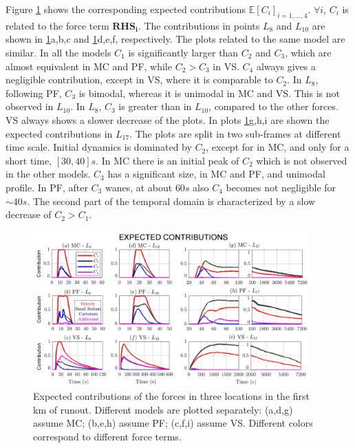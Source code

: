 \documentclass{article}
\begin{document}
Figure \ref{fig:Colima-Ci_1} shows the corresponding expected contributions $\mathbb E[C_i]_{i=1,\dots,4}$. $\forall i$, $C_i$ is related to the force term $\boldsymbol{RHS_i}$. The contributions in points $L_8$ and $L_{10}$ are shown in \ref{fig:Colima-Ci_1}a,b,c and \ref{fig:Colima-Ci_1}d,e,f, respectively. The plots related to the same model are similar. In all the models $C_1$ is significantly larger than $C_2$ and $C_3$, which are almost equivalent in MC and PF, while $C_2>C_3$ in VS. $C_4$ always gives a negligible contribution, except in VS, where it is comparable to $C_2$. In $L_8$, following PF, $C_3$ is bimodal, whereas it is unimodal in MC and VS. This is not observed in $L_{10}$. In $L_8$, $C_3$ is greater than in $L_{10}$, compared to the other forces. VS always shows a slower decrease of the plots. In plots \ref{fig:Colima-Ci_1}g,h,i are shown the expected contributions in $L_{17}$. The plots are split in two sub-frames at different time scale. Initial dynamics is dominated by $C_2$, except for in MC, and only for a short time, $[30, 40] s$. In MC there is an initial peak of $C_2$ which is not observed in the other models. $C_3$ has a significant size, in MC and PF, and unimodal profile. In PF, after $C_3$ wanes, at about $60 s$ also $C_4$ becomes not negligible for $\sim 40 s$. The second part of the temporal domain is characterized by a slow decrease of $C_2>C_1$.
\begin{figure}[H]
         \centering
        \includegraphics[width=0.95\textwidth]{Ci1_total.png}
        \caption{Expected contributions of the forces in three locations in the first km of runout. Different models are plotted separately: (a,d,g) assume MC; (b,e,h) assume PF; (c,f,i) assume VS. Different colors correspond to different force terms.}
        \label{fig:Colima-Ci_1}
\end{figure}
\end{document}

